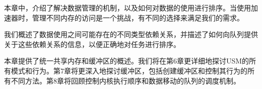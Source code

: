 本章中，介绍了解决数据管理的机制，以及如何对数据的使用进行排序。当使用加速器时，管理不同内存的访问是一个挑战，有不同的选择来满足我们的需求。\par

我们概述了数据使用之间可能存在的不同类型依赖关系，并描述了如何向队列提供关于这些依赖关系的信息，以便正确地对任务进行排序。\par

本章提供了统一共享内存和缓冲区的概述。我们将在第6章更详细地探讨USM的所有模式和行为。第7章将更深入地探讨缓冲区，包括创建缓冲区和控制其行为的所有不同方法。第8章将回顾控制内核执行顺序和数据移动的队列的调度机制。\par